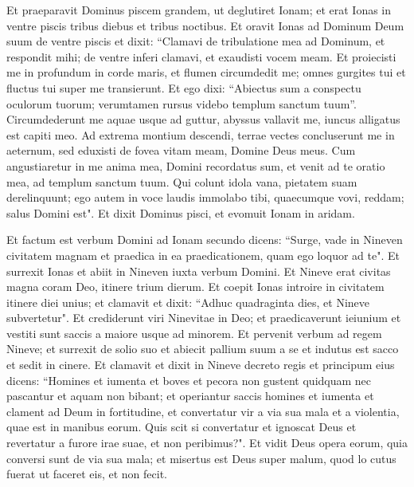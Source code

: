 \begin{biblechapter}  
\verse Et praeparavit Dominus piscem grandem, ut deglutiret Ionam; et erat Ionas in ventre piscis tribus diebus et tribus noctibus. 
\verse Et oravit Ionas ad Dominum Deum suum de ventre piscis 
\verse et dixit: “Clamavi de tribulatione mea ad Dominum, et respondit mihi; de ventre inferi clamavi, et exaudisti vocem meam. 
\verse Et proiecisti me in profundum in corde maris, et flumen circumdedit me; omnes gurgites tui et fluctus tui super me transierunt. 
\verse Et ego dixi: “Abiectus sum a conspectu oculorum tuorum; verumtamen rursus videbo templum sanctum tuum”. 
\verse Circumdederunt me aquae usque ad guttur, abyssus vallavit me, iuncus alligatus est capiti meo. 
\verse Ad extrema montium descendi, terrae vectes concluserunt me in aeternum, sed eduxisti de fovea vitam meam, Domine Deus meus. 
\verse Cum angustiaretur in me anima mea, Domini recordatus sum, et venit ad te oratio mea, ad templum sanctum tuum. 
\verse Qui colunt idola vana, pietatem suam derelinquunt; 
\verse ego autem in voce laudis immolabo tibi, quaecumque vovi, reddam; salus Domini est". 
\verse Et dixit Dominus pisci, et evomuit Ionam in aridam. 
\end{biblechapter}

\begin{biblechapter}  
\verse Et factum est verbum Domini ad Ionam secundo dicens: 
\verse “Surge, vade in Nineven civitatem magnam et praedica in ea praedicationem, quam ego loquor ad te". 
\verse Et surrexit Ionas et abiit in Nineven iuxta verbum Domini. Et Nineve erat civitas magna coram Deo, itinere trium dierum. 
\verse Et coepit Ionas introire in civitatem itinere diei unius; et clamavit et dixit: “Adhuc quadraginta dies, et Nineve subvertetur". 
\verse Et crediderunt viri Ninevitae in Deo; et praedicaverunt ieiunium et vestiti sunt saccis a maiore usque ad minorem. 
\verse Et pervenit verbum ad regem Nineve; et surrexit de solio suo et abiecit pallium suum a se et indutus est sacco et sedit in cinere. 
\verse Et clamavit et dixit in Nineve decreto regis et principum eius dicens: “Homines et iumenta et boves et pecora non gustent quidquam nec pascantur et aquam non bibant; 
\verse et operiantur saccis homines et iumenta et clament ad Deum in fortitudine, et convertatur vir a via sua mala et a violentia, quae est in manibus eorum. 
\verse Quis scit si convertatur et ignoscat Deus et revertatur a furore irae suae, et non peribimus?". 
\verse Et vidit Deus opera eorum, quia conversi sunt de via sua mala; et misertus est Deus super malum, quod lo cutus fuerat ut faceret eis, et non fecit. 
\end{biblechapter}

